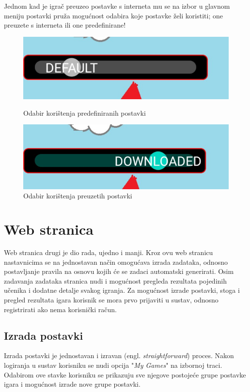 \documentclass[times, utf8, zavrsni, numeric]{fer}
\begin{document}
		Jednom kad je igrač preuzeo postavke s interneta  mu se na izbor u glavnom meniju postavki pruža mogućnost odabira koje postavke želi koristiti; one preuzete s interneta ili one predefinirane!
		
				\begin{figure}[!htb]
			\begin{minipage}{0.48\textwidth}
				\centering
				\includegraphics[scale=0.25]{"slike/usedefault.jpg"} 
				\caption{Odabir korištenja predefiniranih postavki}
				\label{fig:saw1}
			\end{minipage}\hfill
			\begin{minipage}{0.48\textwidth}
				\centering
				\includegraphics[scale=0.25]{"slike/usedownloaded.jpg"} 
				\caption{Odabir korištenja preuzetih postavki}
				\label{fig:saw2}
			\end{minipage}
		\end{figure}
		
		

	\section{Web stranica}
	Web stranica drugi je dio rada, ujedno i manji. Kroz ovu web stranicu nastavnicima se na jednostavan način omogućava izrada zadataka, odnosno postavljanje pravila na osnovu kojih će se zadaci automatski generirati.
	Osim zadavanja zadataka stranica nudi i mogućnost pregleda rezultata pojedinih učenika i dodatne detalje svakog igranja. Za mogućnost izrade postavki, stoga i pregled rezultata igara korisnik se mora prvo prijaviti u sustav, odnosno
	registrirati ako nema korisnički račun.

	\subsection{Izrada postavki}
	Izrada postavki je jednostavan i izravan (engl. \textit{straightforward}) proces. Nakon logiranja u sustav korisniku se nudi opcija "\textit{My Games}" na izbornoj traci. Odabirom ove stavke korisniku se prikazuju sve
	njegove postojeće grupe postavke igara i mogućnost izrade nove grupe postavki. 
	
\end{document}
